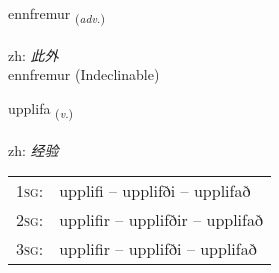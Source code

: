\documentclass[frontgrid, backgrid]{flacards}\usepackage[]{graphicx}\usepackage[]{color}
\begin{document}

\renewcommand{\flhead}{\vskip5pt \fboxsep=0pt {\small\bfseries\footnotesize Atviksorð | 副词}}
\renewcommand{\fcfoot}{\vskip5pt \fboxsep=0pt \hspace{2pt}{\small\bfseries\footnotesize 2K}}

\renewcommand{\blhead}{\vskip5pt {\small\bfseries\footnotesize Atviksorð | 副词 }}
\renewcommand{\bcfoot}{\vskip5pt \hspace{2pt}{\small\bfseries\footnotesize 2K}}


{ennfremur \small{\textsubscript{(\textit{adv.})}} \\[1ex]
\textphonetic{[ɛnfrɛmʏr]} \\
zh: \emph{此外} \\  [2ex]
ennfremur (Indeclinable)}

\renewcommand{\flhead}{\vskip5pt \fboxsep=0pt {\small\bfseries\footnotesize Sagnorð | 动词}}
\renewcommand{\fcfoot}{\vskip5pt \fboxsep=0pt \hspace{2pt}{\small\bfseries\footnotesize 2K}}

\renewcommand{\blhead}{\vskip5pt {\small\bfseries\footnotesize Sagnorð | 动词 }}
\renewcommand{\bcfoot}{\vskip5pt \hspace{2pt}{\small\bfseries\footnotesize 2K}}


{upplifa \small{\textsubscript{(\textit{v.})}} \\[1ex] %
\textphonetic{[ʏhplɪva]} \\
zh: \emph{经验} \\  [2ex]
\renewcommand*{\arraystretch}{0.8}
\begin{tabular}{p{1cm}l}
\textsc{1sg}: & upplifi -- upplifði -- upplifað \\ 
\textsc{2sg}: & upplifir -- upplifðir -- upplifað \\ 
\textsc{3sg}: & upplifir -- upplifði -- upplifað \\ 
\end{tabular}
}
\end{document}
